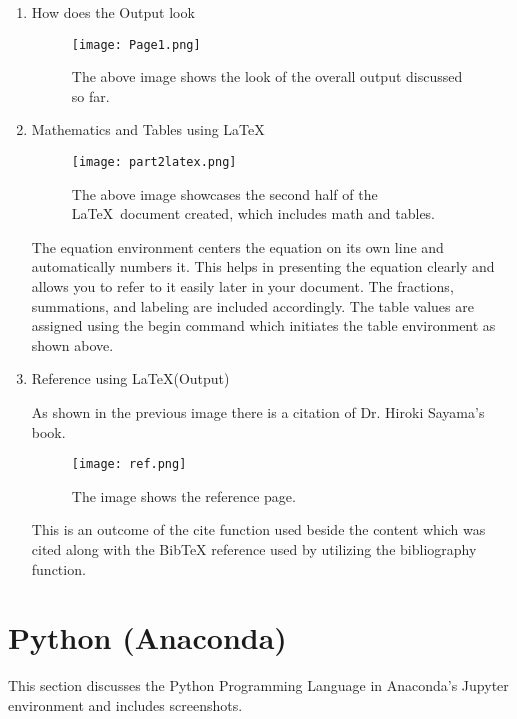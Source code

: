 \documentclass[12pt]{article}
\begin{document}
\begin{enumerate}
\item How does the Output look

\begin{figure}[H]
    \centering
    \texttt{[image: Page1.png]}
    \caption{The above image shows the look of the overall output discussed so far.}
    \label{fig:latex_output}
\end{figure}

\item Mathematics and Tables using \LaTeX

\begin{figure}[H]
    \centering
    \texttt{[image: part2latex.png]}
    \caption{The above image showcases the second half of the \LaTeX\ document created, which includes math and tables.}
    \label{fig:latex_math_tables}
\end{figure}

\newpage 

The equation environment centers the equation on its own line and automatically numbers it. This helps in presenting the equation clearly and allows you to refer to it easily later in your document. The fractions, summations, and labeling are included accordingly. The table values are assigned using the begin command which initiates the table environment as shown above. 

\item Reference using \LaTeX (Output)

As shown in the previous image there is a citation of Dr. Hiroki Sayama's book.

\begin{figure}[H]
    \centering
    \texttt{[image: ref.png]}
    \caption{The image shows the reference page.}
    \label{fig:latex_reference}
\end{figure}

This is an outcome of the cite function used beside the content which was cited along with the BibTeX reference used by utilizing the bibliography function.

\end{enumerate}

\newpage

\section{Python (Anaconda)}

This section discusses the Python Programming Language in Anaconda's Jupyter environment and includes screenshots.
\end{document}

